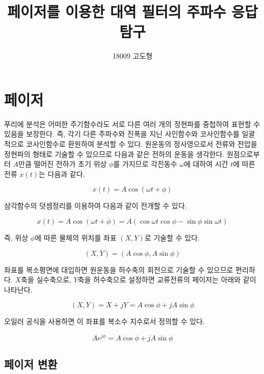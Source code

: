 \documentclass{article}
\begin{document}

\title{페이저를 이용한 대역 필터의 주파수 응답 탐구}
\author{18009 고도형}
\maketitle

\section{페이저}

푸리에 분석은 어떠한 주기함수라도 서로 다른 여러 개의 정현파를 중첩하여 표현할 수 있음을 보장한다. 즉, 각기 다른 주파수와 진폭을 지닌 사인함수와 코사인함수를 일괄적으로 코사인함수로 환원하여 분석할 수 있다. 원운동의 정사영으로서 전류와 전압을 정현파의 형태로 기술할 수 있으므로 다음과 같은 전하의 운동을 생각한다. 원점으로부터 $A$만큼 떨어진 전하가 초기 위상 $\phi$를 가지므로 각진동수 $\omega$에 대하여 시간 $t$에 따른 전류 $x(t)$는 다음과 같다.

\begin{equation}
    x(t)=A \cos(\omega t+\phi)
\end{equation}

삼각함수의 덧셈정리를 이용하여 다음과 같이 전개할 수 있다.

\begin{equation}
    x(t)=A \cos(\omega t+\phi)=A(\cos\omega t\cos\phi-\sin\phi\sin\omega t)
\end{equation}

즉, 위상 $\phi$에 따른 물체의 위치를 좌표 $(X, Y)$로 기술할 수 있다.

\begin{equation}
    (X, Y)=(A\cos\phi, A\sin\phi)
\end{equation}

좌표를 복소평면에 대입하면 원운동을 허수축의 회전으로 기술할 수 있으므로 편리하다. $X$축을 실수축으로, $Y$축을 허수축으로 설정하면 교류전류의 페이저는 아래와 같이 나타난다.

\begin{equation}
    (X, Y)=X+jY=A\cos\phi+jA\sin\phi
\end{equation}

오일러 공식을 사용하면 이 좌표를 복소수 지수로서 정의할 수 있다.

\begin{equation}
    Ae^{j\phi}=A\cos\phi+jA\sin\phi
\end{equation}

\subsection{페이저 변환}
\end{document}
